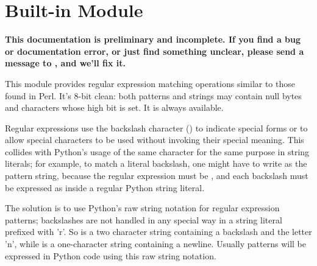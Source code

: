 \section{Built-in Module }
\label{module-re}


{\large\bf This documentation is preliminary and incomplete.  If you
find a bug or documentation error, or just find something unclear,
please send a message to
, and we'll fix it.}

This module provides regular expression matching operations similar to
those found in Perl.  It's 8-bit clean: both patterns and strings may
contain null bytes and characters whose high bit is set.  It is always
available.

Regular expressions use the backslash character (\code{\e}) to
indicate special forms or to allow special characters to be used
without invoking their special meaning.  This collides with Python's
usage of the same character for the same purpose in string literals;
for example, to match a literal backslash, one might have to write
\code{\e\e\e\e} as the pattern string, because the regular expression
must be \code{\e\e}, and each backslash must be expressed as
\code{\e\e} inside a regular Python string literal. 

The solution is to use Python's raw string notation for regular
expression patterns; backslashes are not handled in any special way in
a string literal prefixed with 'r'.  So  is a two
character string containing a backslash and the letter 'n', while
 is a one-character string containing a newline.  Usually
patterns will be expressed in Python code using this raw string notation.



